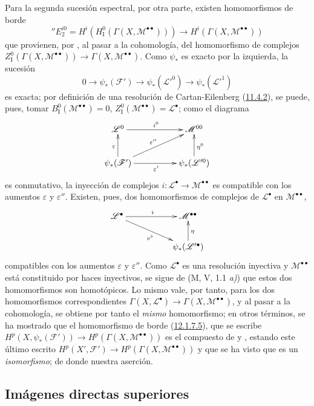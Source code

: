\begin{env}[12.1.7]
Para la segunda sucesión espectral, por otra parte, existen homomorfismos
de borde
\[
\label{0.12.1.7.5-fr}
\tag{12.1.7.5}
''E_2^{i0}=H^i(H_{\mathrm I}^0(\Gamma(X,\mathcal M^{\bullet\bullet})))
\longrightarrow H^i(\Gamma(X,\mathcal M^{\bullet\bullet}))
\]
que provienen, por , al pasar a la cohomología, del
homomorfismo de complejos
$Z_{\mathrm I}^0(\Gamma(X,\mathcal M^{\bullet\bullet}))
\to\Gamma(X,\mathcal M^{\bullet\bullet})$.
Como $\psi_*$ es exacto por la izquierda, la sucesión
\[
0\longrightarrow\psi_*(\mathcal F')\longrightarrow
\psi_*(\mathcal L'^0)\longrightarrow\psi_*(\mathcal L'^1)
\]
es exacta; por definición de una resolución de Cartan-Eilenberg (\hyperref[0.11.4.2-fr]{11.4.2}), se puede, pues, tomar $B_{\mathrm I}^0(\mathcal M^{\bullet\bullet})=0$, $Z_{\mathrm I}^0(\mathcal M^{\bullet\bullet})=\mathcal L^\bullet$; como el diagrama
\[
\xymatrix@C=50pt@R=24pt{
\mathcal L^0\ar[r]^{i^0}&\mathcal M^{00}\\
\psi_*(\mathcal F')\ar[u]^\varepsilon
\ar[r]_{\varepsilon'}\ar[ur]^{\varepsilon''}
&\psi_*(\mathcal L'^0)\ar[u]_{\eta^0}
}
\]
es conmutativo, la inyección de complejos
$i:\mathcal L^\bullet\to\mathcal M^{\bullet\bullet}$ es compatible con los
aumentos $\varepsilon$ y $\varepsilon''$.
Existen, pues, dos homomorfismos de complejos de $\mathcal L^\bullet$
en $\mathcal M^{\bullet\bullet}$,
\[
\xymatrix@C=52pt@R=22pt{
\mathcal L^\bullet\ar[r]^i\ar[dr]_{v^\flat}
&\mathcal M^{\bullet\bullet}\\
&\psi_*(\mathcal L'^\bullet)\ar[u]_\eta
}
\]
compatibles con los aumentos $\varepsilon$ y
$\varepsilon''$.
Como $\mathcal L^\bullet$ es una resolución inyectiva y
$\mathcal M^{\bullet\bullet}$ está constituido por haces inyectivos, se sigue
de (M, V, 1.1 \textit{a)}) que estos dos homomorfismos son homotópicos.
Lo mismo vale, por tanto, para los dos homomorfismos correspondientes
$\Gamma(X,\mathcal L^\bullet)\to\Gamma(X,\mathcal M^{\bullet\bullet})$, y al pasar a la cohomología, se obtiene por tanto el \emph{mismo} homomorfismo; en otros términos, se ha mostrado que el homomorfismo de borde (\hyperref[0.12.1.7.5-fr]{12.1.7.5}), que se escribe $H^p(X,\psi_*(\mathcal F'))\to H^p(\Gamma(X,\mathcal M^{\bullet\bullet}))$
es el compuesto de  y
, estando este último escrito
$H^p(X',\mathcal F')\to H^p(\Gamma(X,\mathcal M^{\bullet\bullet}))$ y que se ha visto que es un \emph{isomorfismo}; de donde nuestra aserción.
\end{env}

\subsection{Imágenes directas superiores}
\label{subsection:0.12.2-fr}

